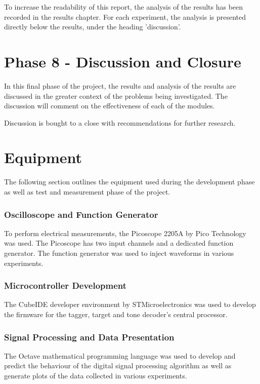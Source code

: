 To increase the readability of this report, the analysis of the results has been recorded in the results chapter. For each experiment, the analysis is presented directly below the results, under the heading 'discussion'.


\section{Phase 8 - Discussion and Closure}

In this final phase of the project, the results and analysis of the results are discussed in the greater context of the problems being investigated. The discussion will comment on the effectiveness of each of the modules. 

Discussion is bought to a close with recommendations for further research.



\section{Equipment}
\label{sec:test_and_measurement_equipment}
The following section outlines the equipment used during the development phase as well as test and measurement phase of the project.

\subsubsection{Oscilloscope and Function Generator}
To perform electrical measurements, the Picoscope 2205A by Pico Technology was used. The Picoscope has two input channels and a dedicated function generator. The function generator was used to inject waveforms in various experiments.

\subsubsection{Microcontroller Development}
The CubeIDE developer environment by STMicroelectronics was used to develop the firmware for the tagger, target and tone decoder's central processor.

\subsubsection{Signal Processing and Data Presentation}
The Octave mathematical programming language was used to develop and predict the behaviour of the digital signal processing algorithm as well as generate plots of the data collected in various experiments.

